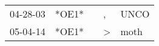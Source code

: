 \begin{supertabular}{p{0.07\textwidth}p{0.06\textwidth}p{0.02\textwidth}p{0.02\textwidth}p{0.06\textwidth}}
 04-28-03\textsuperscript{} &  *OE1* &   &             , &  UNCO\textsuperscript{} \\
 05-04-14\textsuperscript{} &  *OE1* &   &  \textgreater &  moth\textsuperscript{} \\
\end{supertabular}
